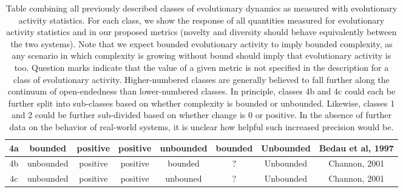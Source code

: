 \documentclass[letterpaper]{article}
\begin{document}
\begin{table}[]
\begin{tabular}{|c|c|c|c|c|c|c|c|}
4a             & bounded                                                                                   & positive        & positive                                                             & unbounded                                                          & bounded                  & Unbounded                                                                                 & Bedau et al, 1997     \\ \hline
4b             & unbounded                                                                                 & positive        & positive                                                             & bounded                                                            & ?                   & Unbounded                                                                                 & Channon, 2001         \\ \hline
4c             & unbounded                                                                                 & positive        & positive                                                             & unbouned                                                           & ?                   & Unbounded                                                                                 & Channon, 2001         \\ \hline
\end{tabular}
\caption{Table combining all previously described classes of evolutionary dynamics as measured with evolutionary activity statistics. For each class, we show the response of all quantities measured for evolutionary activity statistics and in our proposed metrics (novelty and diversity should behave equivalently between the two systems). Note that we expect bounded evolutionary activity to imply bounded complexity, as any scenario in which complexity is growing without bound should imply that evolutionary activity is too. Question marks indicate that the value of a given metric is not specified in the description for a class of evolutionary activity. Higher-numbered classes are generally believed to fall further along the continuum of open-endedness than lower-numbered classes. In principle, classes 4b and 4c could each be further split into sub-classes based on whether complexity is bounded or unbounded. Likewise, classes 1 and 2 could be further sub-divided based on whether change is 0 or positive. In the absence of further data on the behavior of real-world systems, it is unclear how helpful such increased precision would be. \label{eastats}}
\end{table}
\end{document}
